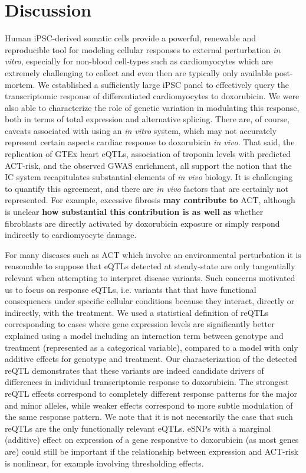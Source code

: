 \documentclass{article}
\newcommand{\tempbold}[1]{\textbf{#1}}
\begin{document}
\section*{Discussion}

Human iPSC-derived somatic cells provide a powerful, renewable and reproducible tool for modeling cellular responses to external perturbation \emph{in vitro}, especially for non-blood cell-types such as cardiomyocytes which are extremely challenging to collect and even then are typically only available post-mortem. 
We established a sufficiently large iPSC panel to effectively query the transcriptomic response of differentiated cardiomyocytes to doxorubicin. We were also able to characterize the role of genetic variation in modulating this response, both in terms of total expression and alternative splicing. 
There are, of course, caveats associated with using an \emph{in vitro} system, which may not accurately represent certain aspects cardiac response to doxorubicin \emph{in vivo}. 
That said, the replication of GTEx heart eQTLs, association of troponin levels with predicted ACT-risk\cite{Burridge2016}, and the observed GWAS enrichment, all support the notion that the IC system recapitulates substantial elements of \emph{in vivo} biology. 
It is challenging to quantify this agreement, and there are \emph{in vivo} factors that are certainly not represented. For example, excessive fibrosis \tempbold{may contribute to} ACT\cite{cascales2013association,zhan2016ataxia,farhad2016characterization,Heck2017-jc}, although is unclear \tempbold{how substantial this contribution is as well as} whether fibroblasts are directly activated by doxorubicin exposure or simply respond indirectly to cardiomyocyte damage. 

For many diseases such as ACT which involve an environmental perturbation it is reasonable to suppose that eQTLs detected at steady-state are only tangentially relevant when attempting to interpret disease variants.
Such concerns motivated us to focus on response eQTLs, i.e. variants that that have functional consequences under specific cellular conditions because they interact, directly or indirectly, with the treatment.
We used a statistical definition of reQTLs corresponding to cases where gene expression levels are significantly better explained using a model including an interaction term between genotype and treatment (represented as a categorical variable), compared to a model with only additive effects for genotype and treatment. 
Our characterization of the detected reQTL demonstrates that these variants are indeed candidate drivers of differences in individual transcriptomic response to doxorubicin. The strongest reQTL effects correspond to completely different response patterns for the major and minor alleles, while weaker effects correspond to more subtle modulation of the same response pattern. 
We note that it is not necessarily the case that such reQTLs are the only functionally relevant eQTLs. eSNPs with a marginal (additive) effect on expression of a gene responsive to doxorubicin (as most genes are) could still be important if the relationship between expression and ACT-risk is nonlinear, for example involving thresholding effects. 
\end{document}
